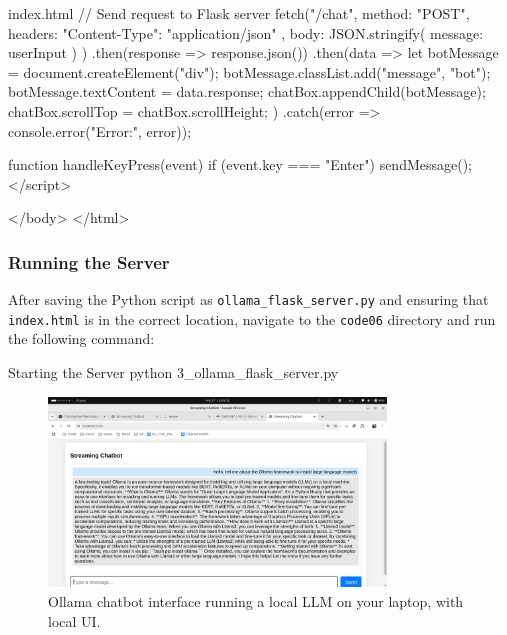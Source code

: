 \begin{codeonly}{index.html}
{            // Send request to Flask server
            fetch("/chat", {
                method: "POST",
                headers: { "Content-Type": "application/json" },
                body: JSON.stringify({ message: userInput })
            })
            .then(response => response.json())
            .then(data => {
                let botMessage = document.createElement("div");
                botMessage.classList.add("message", "bot");
                botMessage.textContent = data.response;
                chatBox.appendChild(botMessage);
                chatBox.scrollTop = chatBox.scrollHeight;
            })
            .catch(error => console.error("Error:", error));
        }

        function handleKeyPress(event) {
            if (event.key === "Enter") {
                sendMessage();
            }
        }
    </script>

</body>
</html>
\end{codeonly}

\subsubsection{Running the Server}

After saving the Python script as \texttt{ollama\_flask\_server.py} and ensuring that \texttt{index.html} is in the correct location, navigate to the \texttt{code06} directory and run the following command:

\begin{codeonly}{Starting the Server}
python 3_ollama_flask_server.py
\end{codeonly}

\begin{figure}[h]
    \centering
    \includegraphics[width=0.8\textwidth]{images/ollama_chatbot.png}
    \caption{Ollama chatbot interface running a local LLM on your laptop, with local UI.}
    \label{fig:ollama_chatbot}
\end{figure}

